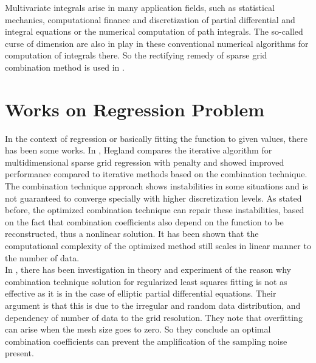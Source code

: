 Multivariate integrals arise in many application fields, such as statistical mechanics, computational finance and discretization of partial differential and integral equations or the numerical computation of path integrals. The so-called curse of dimension are also in play in these conventional numerical algorithms for computation of integrals there. So the rectifying remedy of sparse grid combination method is used in \cite{Gerstner1998}.
\section{Works on Regression Problem}
In the context of regression or basically fitting the function to given values, there has been some works. In \cite{Hegland2002}, Hegland compares the iterative algorithm for multidimensional sparse grid regression with penalty and showed improved performance compared to iterative methods based on the combination technique.\\
The combination technique approach shows instabilities in some situations and is not guaranteed to converge specially with higher discretization levels. As stated before, the optimized combination technique can repair these instabilities, based on the fact that combination coefficients also depend on the function to be reconstructed, thus a nonlinear solution. It has been shown that the computational complexity of the optimized method still scales in linear manner to the number of data.\cite{Garcke2006}\\

In \cite{Garcke2009}, there has been investigation in theory and experiment of the reason why combination technique solution for regularized least squares fitting is not as effective as it is in the case of elliptic partial differential equations. Their argument is that this is due to the irregular and random data distribution, and dependency of number of data to the grid resolution. They note that overfitting can arise when the mesh size goes to zero. So they conclude an optimal combination coefficients can prevent the amplification of the sampling noise present.\\

